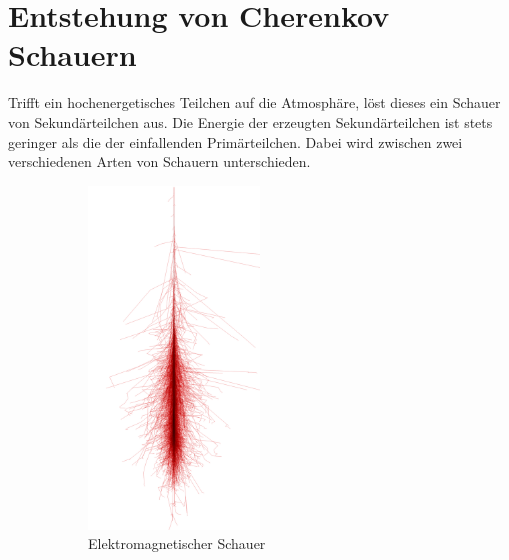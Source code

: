 \chapter{Entstehung von Cherenkov Schauern}
\label{sec:cherenkov}
Trifft ein hochenergetisches Teilchen auf die Atmosphäre, löst dieses ein Schauer von Sekundärteilchen aus. 
Die Energie der erzeugten Sekundärteilchen ist stets geringer als die der einfallenden Primärteilchen. 
Dabei wird zwischen zwei verschiedenen Arten von Schauern unterschieden. 
\begin{figure}[H]
  \centering
  \begin{subfigure}[t]{0.49\textwidth}
  	\centering
	\includegraphics[width=0.5\textwidth]{images/photon_100GeV.png}
	\caption{Elektromagnetischer Schauer}
  \end{subfigure}
  \begin{subfigure}[t]{0.49\textwidth}
  	\centering

\end{subfigure}
\end{figure}
